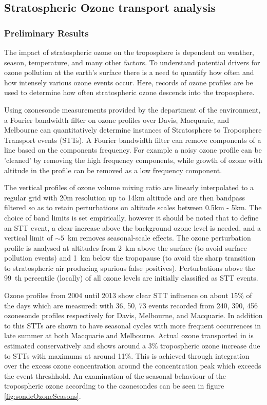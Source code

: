 \subsection{Stratospheric Ozone transport analysis}
\subsubsection{Preliminary Results}
The impact of stratospheric ozone on the troposphere is dependent on weather, season, temperature, and many other factors.
To understand potential drivers for ozone pollution at the earth's surface there is a need to quantify how often and how intensely various ozone events occur.
Here, records of ozone profiles are be used to determine how often stratospheric ozone descends into the troposphere.

Using ozonesonde measurements provided by the department of the environment, a Fourier bandwidth filter on ozone profiles over Davis, Macquarie, and Melbourne can quantitatively determine instances of Stratosphere to Troposphere Transport events (STTs).
A Fourier bandwidth filter can remove components of a line based on the components frequency.
For example a noisy ozone profile can be 'cleaned' by removing the high frequency components, while growth of ozone with altitude in the profile can be removed as a low frequency component. 

The vertical profiles of ozone volume mixing ratio are linearly interpolated to a regular grid with 20m resolution up to 14km altitude and are then bandpass filtered so as to retain perturbations on altitude scales between 0.5km - 5km. 
The choice of band limits is set empirically, however it should be noted that to define an STT event, a clear increase above the background ozone level is needed, and a vertical limit of $\sim 5$~km removes seasonal-scale effects. 
The ozone perturbation profile is analysed at altitudes from 2~km above the surface (to avoid surface pollution events) and 1~km below the tropopause (to avoid the sharp transition to stratospheric air producing spurious false positives).
Perturbations above the 99~th percentile (locally) of all ozone levels are initially classified as STT events.

Ozone profiles from 2004 until 2013 show clear STT influence on about 15\% of the days which are measured: with 36, 50, 73 events recorded from 240, 390, 456 ozonesonde profiles respectively for Davis, Melbourne, and Macquarie.
In addition to this STTs are shown to have seasonal cycles with more frequent occurrences in late summer at both Macquarie and Melbourne.
Actual ozone transported in is estimated conservatively and shows around a 3\% tropospheric ozone increase due to STTs with maximums at around 11\%.
This is achieved through integration over the excess ozone concentration around the concentration peak which exceeds the event threshhold. 
An examination of the seasonal behaviour of the tropospheric ozone according to the ozonesondes can be seen in figure \ref{fig:sondeOzoneSeasons}.

